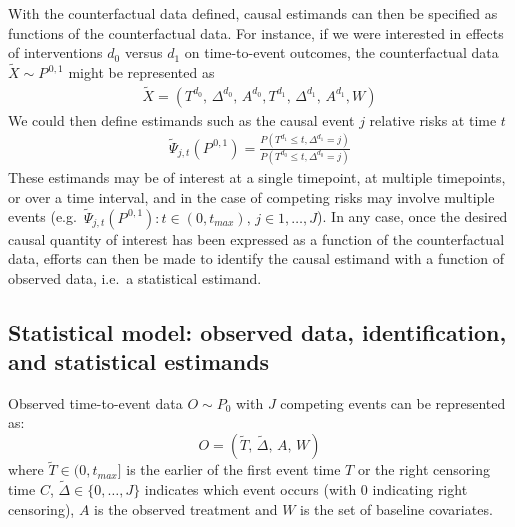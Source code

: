 With the counterfactual data defined, causal estimands can then be specified as functions of the counterfactual data. For instance, if we were interested in effects of interventions \(d_0\) versus \(d_1\) on time-to-event outcomes, the counterfactual data \(\widetilde{X} \sim P^{\,0,1}\) might be represented as \begin{align*}
\widetilde{X} = \left(T^{d_0},\, \Delta^{d_0},\, A^{d_0}, T^{d_1},\, \Delta^{d_1},\, A^{d_1}, {W}\right)
\end{align*} We could then define estimands such as the causal event \(j\) relative risks at time \(t\) \begin{align}
\tilde\Psi_{j, t}(P^{\,0,1}) = \frac{{P}(T^{d_1} \leq t, \Delta^{d_1} = j)}{{P}(T^{d_{0}} \leq t, \Delta^{d_{0}} = j)}
\label{causalrisk}
\end{align} These estimands may be of interest at a single timepoint, at multiple timepoints, or over a time interval, and in the case of competing risks may involve multiple events (e.g.~\(\tilde\Psi_{j, t}(P^{\,0, 1}) : t \in (0, t_{max}), \, j \in 1, \dots, J\)). In any case, once the desired causal quantity of interest has been expressed as a function of the counterfactual data, efforts can then be made to identify the causal estimand with a function of observed data, i.e.~a statistical estimand.

\hypertarget{sec-observed}{%
\subsection{Statistical model: observed data, identification, and statistical estimands}\label{sec-observed}}

Observed time-to-event data \(O \sim P_0\) with \(J\) competing events can be represented as: \begin{equation}
 O = \left(\widetilde T,\, {\tilde{\Delta}},\, A,\, {W}\right) \label{obs-data}
\end{equation} where \(\widetilde T\in (0, t_{max}]\) is the earlier of the first event time \(T\) or the right censoring time \(C\), \({\tilde{\Delta}}\in \{0, \dots, J\}\) indicates which event occurs (with 0 indicating right censoring), \(A\) is the observed treatment and \({W}\) is the set of baseline covariates.

